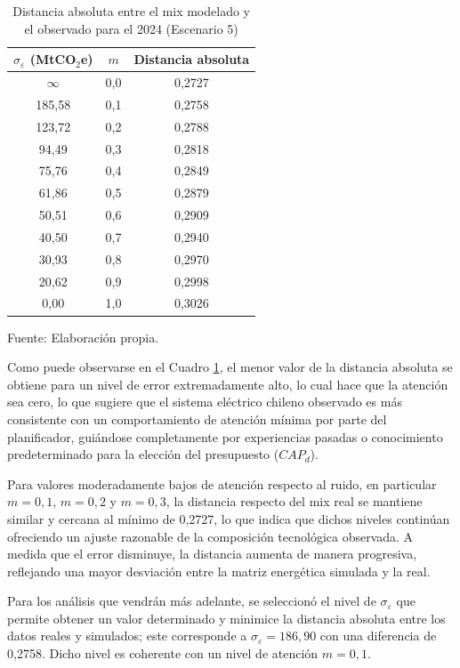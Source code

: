 \begin{table}[H]
\centering
\small
\caption{Distancia absoluta entre el mix modelado y el observado para el 2024 (Escenario 5)}
\label{tab:top10_distancia_mix}
\renewcommand{\arraystretch}{1.1}
\setlength{\tabcolsep}{6pt}
\begin{tabular}{c c c}
\toprule
\textbf{$\sigma_{\varepsilon}$ (MtCO$_2$e)} & \textbf{$m$} & \textbf{Distancia absoluta} \\
\midrule
$\infty$ & 0,0 & 0,2727 \\
185,58 & 0,1 & 0,2758 \\
123,72 & 0,2 & 0,2788 \\
94,49  & 0,3 & 0,2818 \\
75,76  & 0,4 & 0,2849 \\
61,86  & 0,5 & 0,2879 \\
50,51  & 0,6 & 0,2909 \\
40,50  & 0,7 & 0,2940 \\
30,93  & 0,8 & 0,2970 \\
20,62  & 0,9 & 0,2998 \\
0,00   & 1,0 & 0,3026 \\
\bottomrule
\end{tabular}

\vspace{0.15cm}
\footnotesize{Fuente: Elaboración propia.}
\end{table}
                  
Como puede observarse en el Cuadro \ref{tab:top10_distancia_mix}, el menor valor de la distancia absoluta se obtiene para un nivel de error extremadamente alto, lo cual hace que la atención sea cero, lo que sugiere que el sistema eléctrico chileno observado es más consistente con un comportamiento de atención mínima por parte del planificador, guiándose completamente por experiencias pasadas o conocimiento predeterminado para la elección del presupuesto ($CAP_d$). \medskip

Para valores moderadamente bajos de atención respecto al ruido, en particular $m = 0{,}1$, $m = 0{,}2$ y $m = 0{,}3$, la distancia respecto del mix real se mantiene similar y cercana al mínimo de 0,2727, lo que indica que dichos niveles continúan ofreciendo un ajuste razonable de la composición tecnológica observada. A medida que el error disminuye, la distancia aumenta de manera progresiva, reflejando una mayor desviación entre la matriz energética simulada y la real. \medskip

Para los análisis que vendrán más adelante, se seleccionó el nivel de $\sigma_\varepsilon$ que permite obtener un valor determinado y minimice la distancia absoluta entre los datos reales y simulados; este corresponde a  $\sigma_{\varepsilon} = 186,90$ con una diferencia de 0,2758. Dicho nivel es coherente con un nivel de atención $m=0,1$. 

